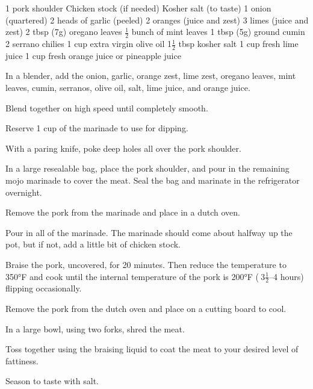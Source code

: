 \dishtype{\main}
\begin{ingreds}
    1 pork shoulder
    Chicken stock (if needed)
    Kosher salt (to taste)
    1 onion (quartered)
    2 heads of garlic (peeled)
    2 oranges (juice and zest)
    3 limes (juice and zest)
    2 tbsp (7g) oregano leaves
    $\frac{1}{2}$ bunch of mint leaves
    1 tbsp (5g) ground cumin
    2 serrano chilies
    1 cup extra virgin olive oil
    1$\frac{1}{2}$ tbsp kosher salt
    1 cup fresh lime juice
    1 cup fresh orange juice or pineapple juice
\end{ingreds}
\begin{method}
    In a blender, add the onion, garlic, orange zest, lime zest, oregano leaves, mint leaves, cumin, serranos, olive oil, salt, lime juice, and orange juice.\par
    Blend together on high speed until completely smooth.\par
    Reserve 1 cup of the marinade to use for dipping.\par
    With a paring knife, poke deep holes all over the pork shoulder.\par
    In a large resealable bag, place the pork shoulder, and pour in the remaining mojo marinade to cover the meat. Seal the bag and marinate in the refrigerator overnight.\par
    Remove the pork from the marinade and place in a dutch oven.\par
    Pour in all of the marinade. The marinade should come about halfway up the pot, but if not, add a little bit of chicken stock.\par
    Braise the pork, uncovered, for 20 minutes. Then reduce the temperature to 350°F and cook until the internal temperature of the pork is 200°F ($~$3$\frac{1}{2}$--4 hours) flipping occasionally.\par
    Remove the pork from the dutch oven and place on a cutting board to cool.\par
    In a large bowl, using two forks, shred the meat.\par
    Toss together using the braising liquid to coat the meat to your desired level of fattiness.\par
    Season to taste with salt.    
\end{method}